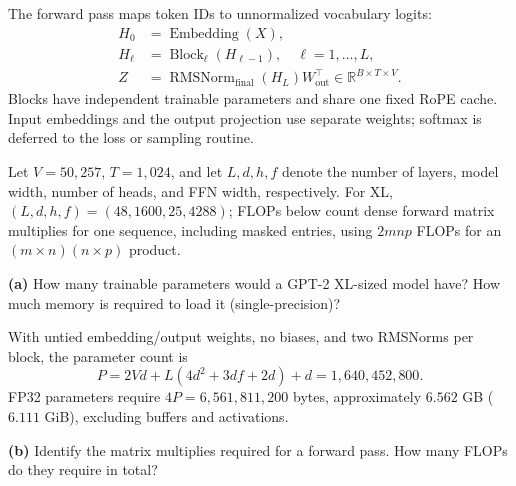 

The forward pass maps token IDs to
unnormalized vocabulary logits:
\begin{align*}
H_0&=\operatorname{Embedding}(X),\\
H_\ell&=\operatorname{Block}_\ell(H_{\ell-1}),\quad \ell=1,\ldots,L,\\
Z&=\operatorname{RMSNorm}_{\mathrm{final}}(H_L)W_{\mathrm{out}}^\top
\in\mathbb{R}^{B\times T\times V}.
\end{align*}
Blocks have independent trainable parameters and share one fixed RoPE
cache. Input embeddings and the output projection use separate weights;
softmax is deferred to the loss or sampling routine.



Let $V=50{,}257$, $T=1{,}024$, and let $L,d,h,f$ denote the number of layers,
model width, number of heads, and FFN width, respectively. For XL,
$(L,d,h,f)=(48,1600,25,4288)$; FLOPs below count dense forward matrix
multiplies for one sequence, including masked entries, using $2mnp$ FLOPs
for an $(m\times n)(n\times p)$ product.

\textbf{(a)} How many trainable parameters would a GPT-2 XL-sized model have? How much memory is required to load it (single-precision)?


With untied embedding/output weights, no biases, and two RMSNorms per block,
the parameter count is
\[
P=2Vd+L(4d^2+3df+2d)+d=1{,}640{,}452{,}800.
\]
FP32 parameters require $4P=6{,}561{,}811{,}200$ bytes, approximately
$6.562$ GB ($6.111$ GiB), excluding buffers and activations.

\textbf{(b)} Identify the matrix multiplies required for a forward pass. How many FLOPs do they require in total?


